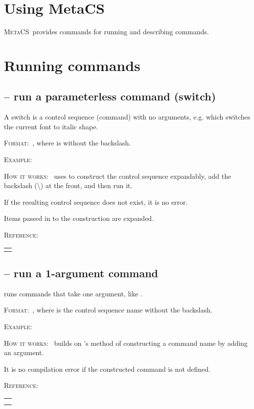 \documentclass{article}
\newcommand{\mm}{\textsc{MetaCS}}
\newcommand{\ff}{\par\textsc{Format:~}}
\newcommand{\ee}{\par\textsc{Example:~}}
\newcommand{\hh}{\par\textsc{How it works:~}}
\newcommand{\rr}{\par\textsc{Reference:~}}
\newcommand{\reftable}[1]{%
\begin{center}
\begin{tabular}{l}
#1 
\end{tabular}
\end{center}

}
\begin{document}
\section{Using MetaCS}
\mm ~provides commands for running and describing commands.

\section{Running commands}
\subsection{\cs{\cc} -- run a parameterless command (switch)}
A switch is a control sequence (command) with no arguments, e.g. \cdrd{\itshape} which switches the current font to italic shape.
\ff\cs{\cc}, where  is without the backslash.
\ee
{}
\hh \cs{\cc} uses  to construct the control sequence expandably, add the backslash (\textbackslash) at the front, and then run it.
\par If the resulting control sequence does not exist, it is no error. 
\par Items passed in to the construction are expanded.
\rr 
\par\reftable{\codedetokb{\cs:w \#1\textbackslash cs\_end:}\\}


\subsection{\cs{\cd} -- run a 1-argument command}
\cs{\cd} runs commands that take one argument, like .
\ff\cs{\cd}, where  is the control sequence name without the backslash.
\ee
{}
\hh\cs{\cd} builds on \cs{\cc}'s method of constructing a command name by adding an argument.
\par It is no compilation error if the constructed command is not defined.
\rr 
\par\reftable{\codedetokb{\tl\_set:Nn \textbackslash l\_my\_tl \{ \#2 \}} \\ \codedetokb{\cs:w \#1\textbackslash cs\_end: \{ \textbackslash  tl\_use:N \textbackslash l\_my\_tl \}}\\}
\end{document}
